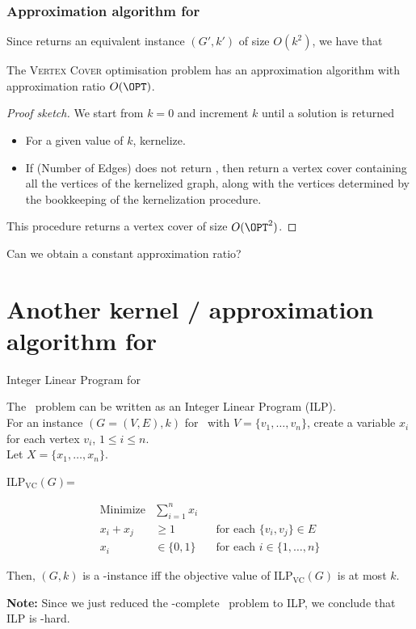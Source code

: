 \begin{frame}
 \frametitle{Approximation algorithm for \VC}

Since \vcpre returns an equivalent instance $(G',k')$ of size $O(k^2)$,
we have that
\begin{corollary}
	The \textsc{Vertex Cover} optimisation problem has an approximation algorithm with approximation ratio $O(\OPT)$.
\end{corollary}
\begin{proof}[Proof sketch]
	We start from $k=0$ and increment $k$ until a solution is returned
	\begin{itemize}
		\item For a given value of $k$, kernelize.\\
		\item If (Number of Edges) does not return \No, then return a vertex cover containing all the vertices of the kernelized graph, along with the vertices determined by the bookkeeping of the kernelization procedure.
	\end{itemize}
	This procedure returns a vertex cover of size $O(\OPT^2)$.	
\end{proof}
Can we obtain a constant approximation ratio?
\end{frame}


\section{Another kernel / approximation algorithm for \VC}


\begin{frame}{Integer Linear Program for \VC}

 The \VC\ problem can be written as an Integer Linear Program (ILP).\\
 For an instance $(G=(V,E),k)$ for \VC\ with $V = \{v_1,\dots,v_n\}$,
 create a variable $x_i$ for each vertex $v_i$, $1\le i\le n$.\\
 Let $X = \{x_1,\dots,x_n\}$.
 
 \begin{center}
  ILP$_{\text{VC}}(G)$=
  \begin{boxedminipage}{0.79 \textwidth}
   \begin{align*}
     \text{Minimize} &\sum_{i=1}^n x_i\\
     x_i + x_j &\ge 1 && \text{for each } \{v_i,v_j\}\in E\\
     x_i &\in \{0,1\} && \text{for each } i \in \{1,\dots,n\}
   \end{align*}
  \end{boxedminipage}
 \end{center}
 
 Then, $(G,k)$ is a \Yes-instance iff the objective value of ILP$_{\text{VC}}(G)$ is at most $k$.
 
 \medskip
 \noindent \textbf{Note:} Since we just reduced the \NP-complete \VC\ problem to ILP, we conclude that ILP is \NP-hard.

\end{frame}


